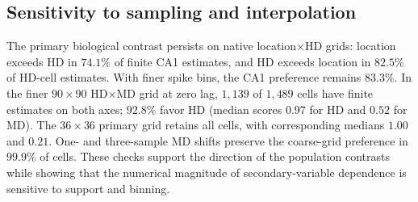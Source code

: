\documentclass[11pt]{article}
\begin{document}
\subsection*{Sensitivity to sampling and interpolation}
The primary biological contrast persists on native location$\times$HD grids: location exceeds HD in $74.1\%$ of finite CA1 estimates, and HD exceeds location in $82.5\%$ of HD-cell estimates. With finer spike bins, the CA1 preference remains $83.3\%$. In the finer $90\times90$ HD$\times$MD grid at zero lag, $1{,}139$ of $1{,}489$ cells have finite estimates on both axes; $92.8\%$ favor HD (median scores $0.97$ for HD and $0.52$ for MD). The $36\times36$ primary grid retains all cells, with corresponding medians $1.00$ and $0.21$. One- and three-sample MD shifts preserve the coarse-grid preference in $99.9\%$ of cells. These checks support the direction of the population contrasts while showing that the numerical magnitude of secondary-variable dependence is sensitive to support and binning.
\end{document}
